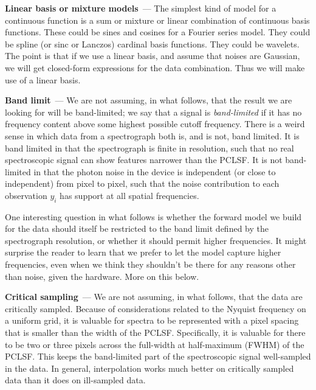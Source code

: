 \documentclass[modern]{aastex631}
\renewcommand{\paragraph}[1]{\medskip\par\noindent\textbf{#1}~---}
\begin{document}
\paragraph{Linear basis or mixture models}
The simplest kind of model for a continuous function is a sum or mixture or linear combination of continuous basis functions.
These could be sines and cosines for a Fourier series model.
They could be spline (or sinc or Lanczos) cardinal basis functions.
They could be wavelets.
The point is that if we use a linear basis, and assume that noises are Gaussian, we will get closed-form expressions for the data combination.
Thus we will make use of a linear basis.

\paragraph{Band limit}
We are not assuming, in what follows, that the result we are looking for will be band-limited;
we say that a signal is \emph{band-limited} if it has no frequency content above some highest possible cutoff frequency.
There is a weird sense in which data from a spectrograph both is, and is not, band limited.
It is band limited in that the spectrograph is finite in resolution, such that no real spectroscopic signal can show features narrower than the PCLSF.
It is not band-limited in that the photon noise in the device is independent (or close to independent) from pixel to pixel, such that the noise contribution to each observation $y_i$ has support at all spatial frequencies.

One interesting question in what follows is whether the forward model we build for the data should itself be restricted to the band limit defined by the spectrograph resolution, or whether it should permit higher frequencies.
It might surprise the reader to learn that we prefer to let the model capture higher frequencies, even when we think they shouldn't be there for any reasons other than noise, given the hardware.
More on this below. %

\paragraph{Critical sampling}
We are not assuming, in what follows, that the data are critically sampled.
Because of considerations related to the Nyquist frequency on a uniform grid, it is valuable for spectra to be represented with a pixel spacing that is smaller than the width of the PCLSF.
Specifically, it is valuable for there to be two or three pixels across the full-width at half-maximum (FWHM) of the PCLSF.
This keeps the band-limited part of the spectroscopic signal well-sampled in the data.
In general, interpolation works much better on critically sampled data than it does on ill-sampled data.
\end{document}
